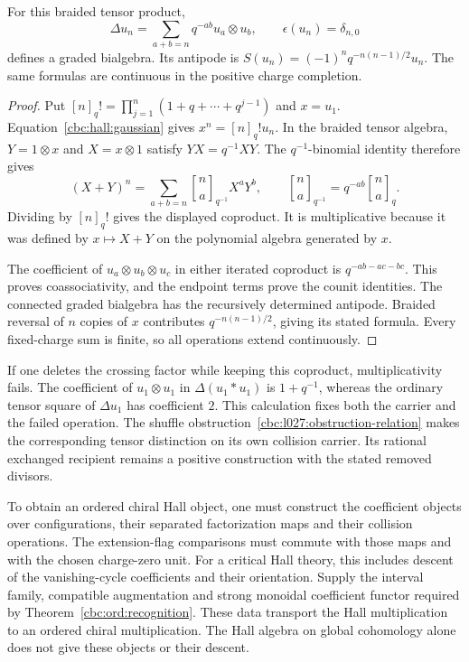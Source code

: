 \begin{proposition}\label{cbc:hall:braided}
For this braided tensor product,
\[
 \Delta u_n=\sum_{a+b=n}q^{-ab}u_a\otimes u_b,
 \qquad \epsilon(u_n)=\delta_{n,0}
\]
defines a graded bialgebra.
Its antipode is
$S(u_n)=(-1)^nq^{-n(n-1)/2}u_n$.
The same formulas are continuous in the positive charge completion.
\end{proposition}
\begin{proof}
Put $[n]_q!=\prod_{j=1}^n(1+q+\cdots+q^{j-1})$ and $x=u_1$.
Equation~\eqref{cbc:hall:gaussian} gives $x^n=[n]_q!u_n$.
In the braided tensor algebra, $Y=1\otimes x$ and $X=x\otimes1$ satisfy $YX=q^{-1}XY$.
The $q^{-1}$-binomial identity therefore gives
\[
 (X+Y)^n
   =\sum_{a+b=n}{n\brack a}_{q^{-1}}X^aY^b,
 \qquad
 {n\brack a}_{q^{-1}}=q^{-ab}{n\brack a}_q.
\]
Dividing by $[n]_q!$ gives the displayed coproduct.
It is multiplicative because it was defined by $x\mapsto X+Y$ on the polynomial algebra generated by $x$.

The coefficient of $u_a\otimes u_b\otimes u_c$ in either iterated coproduct is $q^{-ab-ac-bc}$.
This proves coassociativity, and the endpoint terms prove the counit identities.
The connected graded bialgebra has the recursively determined antipode.
Braided reversal of $n$ copies of $x$ contributes $q^{-n(n-1)/2}$, giving its stated formula.
Every fixed-charge sum is finite, so all operations extend continuously.
\end{proof}

If one deletes the crossing factor while keeping this coproduct, multiplicativity fails.
The coefficient of $u_1\otimes u_1$ in $\Delta(u_1*u_1)$ is $1+q^{-1}$, whereas the ordinary tensor square of $\Delta u_1$ has coefficient $2$.
This calculation fixes both the carrier and the failed operation.
The shuffle obstruction~\eqref{cbc:l027:obstruction-relation} makes the corresponding tensor distinction on its own collision carrier.
Its rational exchanged recipient remains a positive construction with the stated removed divisors.

To obtain an ordered chiral Hall object, one must construct the coefficient objects over configurations, their separated factorization maps and their collision operations.
The extension-flag comparisons must commute with those maps and with the chosen charge-zero unit.
For a critical Hall theory, this includes descent of the vanishing-cycle coefficients and their orientation.
Supply the interval family, compatible augmentation and strong monoidal coefficient functor required by Theorem~\ref{cbc:ord:recognition}.
These data transport the Hall multiplication to an ordered chiral multiplication.
The Hall algebra on global cohomology alone does not give these objects or their descent.

